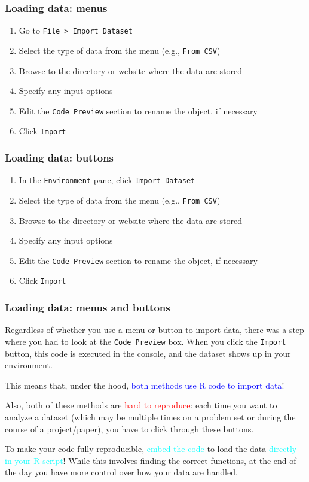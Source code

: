 \documentclass[11pt,dvipsnames]{beamer}
\newcommand{\myframe}[1]{\begin{frame} \frametitle{#1}}
\begin{document}
\myframe{Loading data: menus}
\begin{enumerate}
\item Go to \texttt{File > Import Dataset}
\item Select the type of data from the menu (e.g., \texttt{From CSV})
\item Browse to the directory or website where the data are stored
\item Specify any input options
\item Edit the \texttt{Code Preview} section to rename the object, if necessary
\item Click \texttt{Import}
\end{enumerate}

\end{frame}

\myframe{Loading data: buttons}
\begin{enumerate}
\item In the \texttt{Environment} pane, click \texttt{Import Dataset}
\item Select the type of data from the menu (e.g., \texttt{From CSV})
\item Browse to the directory or website where the data are stored
\item Specify any input options
\item Edit the \texttt{Code Preview} section to rename the object, if necessary
\item Click \texttt{Import} 
\end{enumerate}
\end{frame}

\myframe{Loading data: menus and buttons}
Regardless of whether you use a menu or button to import data, there was a step where you had to look at the \texttt{Code Preview} box. When you click the \texttt{Import} button, this code is executed in the console, and the dataset shows up in your environment.

This means that, under the hood, \textcolor{blue}{both methods use R code to import data}! 

Also, both of these methods are \textcolor{red}{hard to reproduce}: each time you want to analyze a dataset (which may be multiple times on a problem set or during the course of a project/paper), you have to click through these buttons. 

To make your code fully reproducible, \textcolor{cyan}{embed the code} to load the data \textcolor{cyan}{directly in your R script}! While this involves finding the correct functions, at the end of the day you have more control over how your data are handled.
\end{frame}
\end{document}
